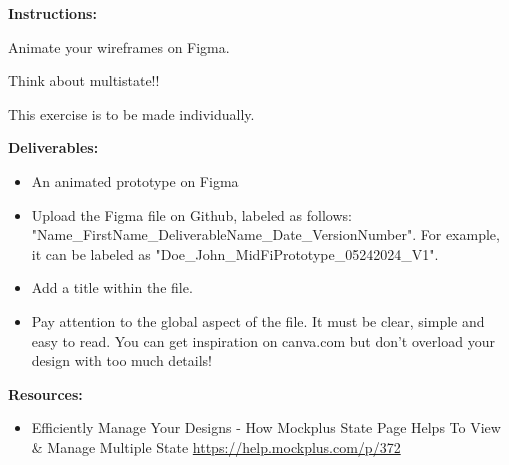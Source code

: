 \makeheaderfiles

\textbf{Instructions:}

Animate your wireframes on Figma.

Think about multistate!!

This exercise is to be made individually.

\textbf{Deliverables:}

\begin{itemize}
\item An animated prototype on Figma
\item Upload the Figma file on Github, labeled as follows: "Name\_FirstName\_DeliverableName\_Date\_VersionNumber". For example, it can be labeled as "Doe\_John\_MidFiPrototype\_05242024\_V1".
\item Add a title within the file.
\item Pay attention to the global aspect of the file. It must be clear, simple and easy to read. You can get inspiration on canva.com but don't overload your design with too much details!
\end{itemize}

\textbf{Resources:}

\begin{itemize}
\item Efficiently Manage Your Designs - How Mockplus State Page Helps To View \& Manage Multiple State \url{https://help.mockplus.com/p/372}
\end{itemize}

